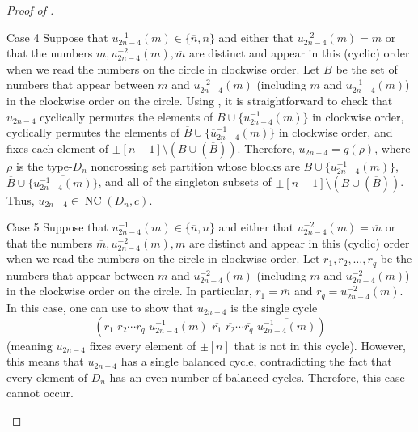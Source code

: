 \documentclass[10pt,a4paper]{amsart}
\newenvironment{enonce*}[2][remark]{\par\medskip\noindent\textit{#2.}\ }{\par}
\DeclareMathOperator{\NC}{NC}
\begin{document}
\begin{proof}[Proof of ]
\begin{enonce*}[remark]{Case 4} Suppose that $u_{2n-4}^{-1}(m)\in\{\overline n,n\}$ and either that $u_{2n-4}^{-2}(m)=m$ or that the numbers $m,u_{2n-4}^{-2}(m),\overline m$ are distinct and appear in this (cyclic) order when we read the numbers on the circle in clockwise order. Let $B$ be the set of numbers that appear between $m$ and $u_{2n-4}^{-2}(m)$ (including $m$ and $u_{2n-4}^{-1}(m)$) in the clockwise order on the circle. Using , it is straightforward to check that $u_{2n-4}$ cyclically permutes the elements of $B\cup\{u_{2n-4}^{-1}(m)\}$ in clockwise order, cyclically permutes the elements of $\overline B\cup\{\overline u_{2n-4}^{-1}(m)\}$ in clockwise order, and fixes each element of $\pm[n-1]\setminus (B\cup(\overline B))$. Therefore, $u_{2n-4}=g(\rho)$, where $\rho$ is the type-$D_n$ noncrossing set partition whose blocks are $B\cup\{u_{2n-4}^{-1}(m)\}$, $\overline B\cup\{\overline{u_{2n-4}^{-1}(m)}\}$, and all of the singleton subsets of $\pm[n-1]\setminus (B\cup(\overline B))$. Thus, $u_{2n-4}\in\NC(D_n,c)$. 
\end{enonce*}


\begin{enonce*}[remark]{Case 5} Suppose that $u_{2n-4}^{-1}(m)\in\{\overline n,n\}$ and either that $u_{2n-4}^{-2}(m)=\overline m$ or that the numbers $\overline m,u_{2n-4}^{-2}(m),m$ are distinct and appear in this (cyclic) order when we read the numbers on the circle in clockwise order. Let $r_1,r_2,\ldots,r_q$ be the numbers that appear between $\overline m$ and $u_{2n-4}^{-2}(m)$ (including $\overline m$ and $u_{2n-4}^{-2}(m)$) in the clockwise order on the circle. In particular, $r_1=\overline m$ and $r_q=u_{2n-4}^{-2}(m)$. In this case, one can use  to show that $u_{2n-4}$ is the single cycle 
\[
(r_1\,\,r_2\cdots r_q\,\, u_{2n-4}^{-1}(m)\,\,\overline {r_1}\,\,\overline {r_2}\cdots \overline{r_q}\,\,\overline{u_{2n-4}^{-1}(m)})
\]
 (meaning $u_{2n-4}$ fixes every element of $\pm[n]$ that is not in this cycle). However, this means that $u_{2n-4}$ has a single balanced cycle, contradicting the fact that every element of $D_n$ has an even number of balanced cycles. Therefore, this case cannot occur.  \qedhere
\end{enonce*}
\end{proof}
\end{document}
